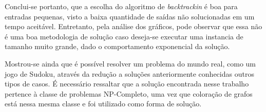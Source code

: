 Conclui-se portanto, que a escolha do algoritmo de \textit{backtrackin} é boa para entradas pequenas, visto a baixa quantidade de saídas não solucionadas em um tempo aceitável. Entretanto, pela análise dos gráficos, pode observar que essa não é uma boa metodologia de solução caso deseja-se executar uma instancia de tamanho muito grande, dado o comportamento exponencial da solução.

Mostrou-se ainda que é possível resolver um problema do mundo real, como um jogo de Sudoku, através da redução a soluções anteriormente conhecidas outros tipos de casos. É necessário ressaltar que a solução encontrada nesse trabalho pertence à classe de problemas NP-Completo, uma vez que coloração de grafos está nessa mesma classe e foi utilizado como forma de solução.